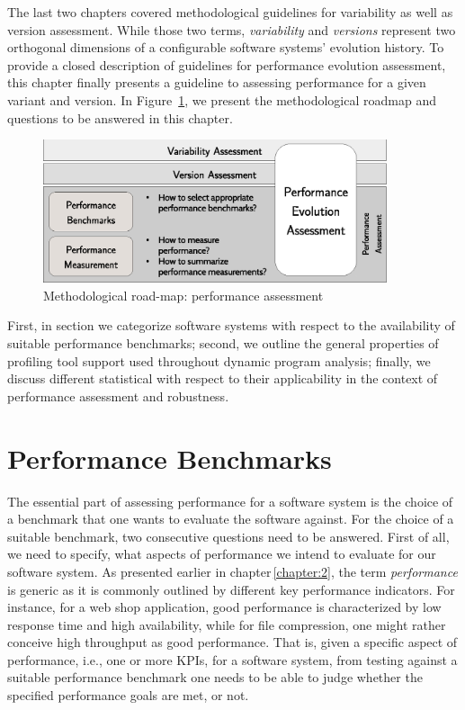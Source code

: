 The last two chapters covered methodological guidelines for variability as well
as version assessment. While those two terms, \emph{variability} and
\emph{versions} represent two orthogonal dimensions of a configurable software
systems’ evolution history. To provide a closed description of guidelines for performance
evolution assessment, this chapter finally presents a guideline to assessing
performance for a given variant and version. In Figure~\ref{fig:roadmap_3}, we
present the methodological roadmap and questions to be answered in this chapter.

\begin{figure}[h!]
	\centering
	\includegraphics[width=0.9\textwidth]{images/process_perfassessment.eps}
	\caption{Methodological road-map: performance assessment}
	\label{fig:roadmap_3}
\end{figure}

First, in section we categorize software systems with respect to the availability of suitable performance
benchmarks; second, we outline the general properties of profiling tool support
used throughout dynamic program analysis; finally, we discuss different statistical
with respect to their applicability in the context of performance assessment
and robustness.

\section{Performance Benchmarks}
The essential part of assessing performance for a software system is the choice
of a benchmark that one wants to evaluate the software against. For the choice
of a suitable benchmark, two consecutive questions need to be answered. First of
all, we need to specify, what aspects of performance we intend to evaluate for
our software system. As presented earlier in chapter\,\ref{chapter:2}, the term
\emph{performance} is generic as it is commonly outlined by different key
performance indicators. For instance, for a web shop application, good performance is characterized by low response
time and high availability, while for file compression, one might rather
conceive high throughput as good performance. That is, given a specific
aspect of performance, i.e., one or more KPIs, for a software system, from
testing against a suitable performance benchmark one needs to be able to judge
whether the specified performance goals are met, or not.

